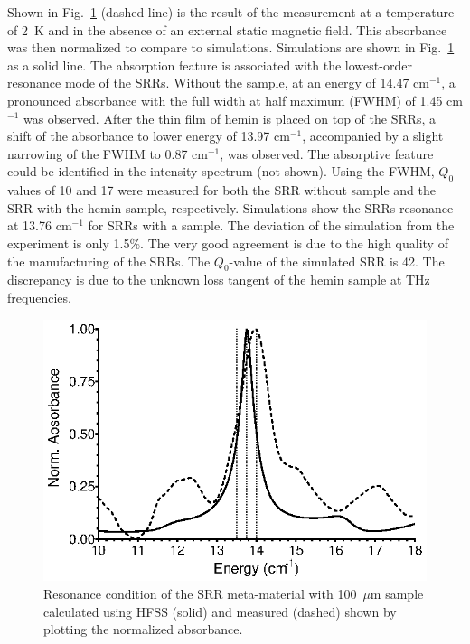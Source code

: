 Shown in Fig.~\ref{ch3-fig:resonator} (dashed line) is the result of the measurement at a temperature of 2~K and in the absence of an external static magnetic field. This absorbance was then normalized to compare to simulations. Simulations are shown in Fig.~\ref{ch3-fig:resonator} as a solid line. The absorption feature is associated with the lowest-order resonance mode of the SRRs. \cite{Katsarakis04} Without the sample, at an energy of 14.47 cm$^{-1}$, a pronounced absorbance with the full width at half maximum (FWHM) of 1.45 cm$^{-1}$ was observed. After the thin film of hemin is placed on top of the SRRs, a shift of the absorbance to lower energy of 13.97 cm$^{-1}$, accompanied by a slight narrowing of the FWHM to 0.87 cm$^{-1}$, was observed. The absorptive feature could be identified in the intensity spectrum (not shown). Using the FWHM, $Q_0$-values of 10 and 17 were measured for both the SRR without sample and the SRR with the hemin sample, respectively. Simulations show the SRRs resonance at 13.76 cm$^{-1}$ for SRRs with a sample. The deviation of the simulation from the experiment is only 1.5\%. The very good agreement is due to the high quality of the manufacturing of the SRRs. The $Q_0$-value of the simulated SRR is 42. The discrepancy is due to the unknown loss tangent of the hemin sample at THz frequencies.


\begin{figure}[htp]\centering
  \includegraphics{Kapitel/Ch3-Images/03-SRR_Profile.eps}%
  \caption[Simulated and measured SRR resonance.]{Resonance condition of the SRR meta-material with 100~$\mu$m sample calculated using HFSS (solid) and measured (dashed) shown by plotting the normalized absorbance.}
  \label{ch3-fig:resonator}
\end{figure}

